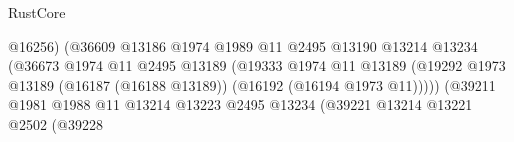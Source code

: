 \begin{lexlean}{RustCore}
\begin{coremodule}
                                                              @16256)
                                                            (@36609
                                                              @13186
                                                              @1974
                                                              @1989
                                                              @11
                                                              @2495
                                                              @13190
                                                              @13214
                                                              @13234
                                                              (@36673
                                                                @1974
                                                                @11
                                                                @2495
                                                                @13189
                                                                (@19333
                                                                  @1974
                                                                  @11
                                                                  @13189
                                                                  (@19292
                                                                    @1973
                                                                    @13189
                                                                    (@16187 (@16188 @13189))
                                                                    (@16192 (@16194 @1973 @11)))))
                                                              (@39211
                                                                @1981
                                                                @1988
                                                                @11
                                                                @13214
                                                                @13223
                                                                @2495
                                                                @13234
                                                                (@39221
                                                                  @13214
                                                                  @13221
                                                                  @2502
                                                                  (@39228

\end{coremodule}
\end{lexlean}
